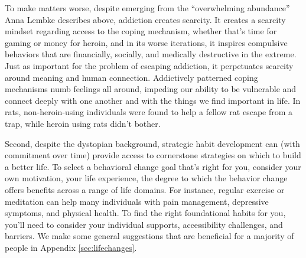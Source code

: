 \documentclass[12pt,letterpaper]{article}
\begin{document}
To make matters worse, despite emerging from the “overwhelming abundance” Anna Lembke describes above, addiction creates scarcity. It creates a scarcity mindset regarding access to the coping mechanism, whether that's time for gaming or money for heroin, and in its worse iterations, it inspires compulsive behaviors that are financially, socially, and medically destructive in the extreme. Just as important for the problem of escaping addiction, it perpetuates scarcity around meaning and human connection. Addictively patterned coping mechanisms numb feelings all around, impeding our ability to be vulnerable and connect deeply with one another and with the things we find important in life. In rats, non-heroin-using individuals were found to help a fellow rat escape from a trap, while heroin using rats didn't bother.

Second, despite the dystopian background, strategic habit development can (with commitment over time) provide access to cornerstone strategies on which to build a better life. To select a behavioral change goal that's right for you, consider your own motivation, your life experience, the degree to which the behavior change offers benefits across a range of life domains.  For instance, regular exercise or meditation can help many individuals with pain management, depressive symptoms, and physical health. To find the right foundational habits for you, you'll need to consider your individual supports, accessibility challenges, and barriers. We make some general suggestions that are beneficial for a majority of people in Appendix \ref{sec:lifechanges}.
\end{document}
